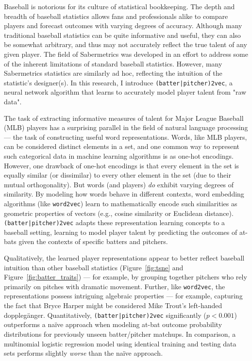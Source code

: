 \documentclass{article}
\begin{document}
\begin{center}

\end{center}

Baseball is notorious for its culture of statistical bookkeeping. The depth and breadth of baseball statistics allows fans and professionals alike to compare players and forecast outcomes with varying degrees of accuracy. Although many traditional baseball statistics can be quite informative and useful, they can also be somewhat arbitrary, and thus may not accurately reflect the true talent of any given player. The field of Sabermetrics was developed in an effort to address some of the inherent limitations of standard baseball statistics. However, many Sabermetrics statistics are similarly ad hoc, reflecting the intuition of the statistic's designer(s). In this research, I introduce \texttt{(batter|pitcher)2vec}, a neural network algorithm that learns to accurately model player talent from "raw data".

The task of extracting informative measures of talent for Major League Baseball (MLB) players has a surprising parallel in the field of natural language processing --- the task of constructing useful word representations. Words, like MLB players, can be considered distinct elements in a set, and one common way to represent such categorical data in machine learning algorithms is as one-hot encodings. However, one drawback of one-hot encodings is that every element in the set is equally similar (or dissimilar) to every other element in the set (due to their mutual orthogonality). But words (and players) \emph{do} exhibit varying degrees of similarity. By modeling how words behave in different contexts, word embedding algorithms (like \texttt{word2vec}) learn to mathematically encode such similarities as geometric properties of vectors (e.g., cosine similarity or Euclidean distance). \texttt{(batter|pitcher)2vec} adapts these representation learning concepts to a baseball setting, learning to model player talent by predicting the outcomes of at-bats given the contexts of specific batters and pitchers.

Qualitatively, the learned player representations appear to better reflect baseball intuition than other baseball statistics (Figure~\ref{fig:tsne} and Figure~\ref{fig:batter_traits}) --- for example, by grouping together pitchers who rely primarily on pitches with dramatic movement. Further, like \texttt{word2vec}, the representations possess intriguing algebraic properties --- for example, capturing the fact that Bryce Harper might be considered Mike Trout's left-handed dopplegänger. Quantitatively, \texttt{(batter|pitcher)2vec} significantly ($p < 0.001$) outperforms a naïve approach when modeling at-bat outcome probability distributions for previously unseen batter/pitcher matchups. In comparison, a multinomial logistic regression model using identical training and testing data sets performs slightly \emph{worse} than the naïve approach.
\end{document}
